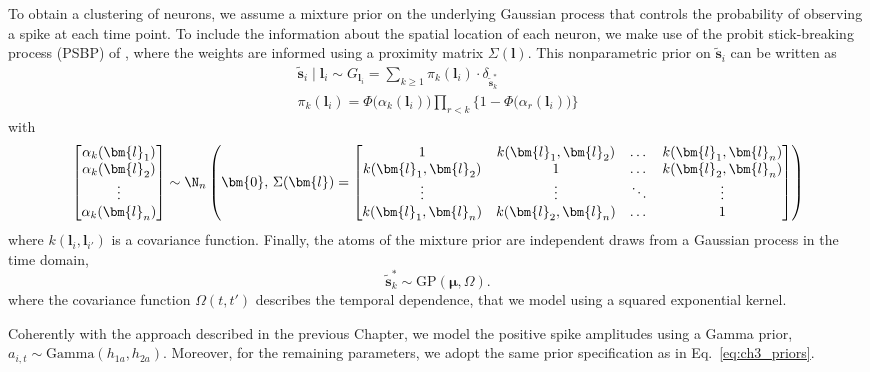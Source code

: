 To obtain a clustering of neurons, we assume a mixture prior on the underlying Gaussian process that controls the probability of observing a spike at each time point. 
To include the information about the spatial location of each neuron, we make use of the probit stick-breaking process (PSBP) of \cite{rodriguez2011}, where the weights are informed using a proximity matrix $\Sigma(\bm{l})$.
This nonparametric prior on $\tilde{\bm{s}}_i$ can be written as
\begin{equation}
\begin{gathered}
\tilde{\bm{s}}_i\mid \bm{l}_i  \sim G_{\bm{l}_i} = \sum_{k\geq1} \pi_k(\bm{l}_i)\cdot \delta_{\tilde{\bm{s}}^*_k }\\
\pi_k(\bm{l}_i) = \Phi\big(\alpha_k(\bm{l}_i)\big) \prod_{r<k} \big\{ 1- \Phi\big(\alpha_r(\bm{l}_i)\big)\big\}
\end{gathered}
\end{equation}
with 
\begin{equation*}
\begin{bmatrix}
\alpha_k(\bm{l}_1) \\
\alpha_k(\bm{l}_2) \\
\vdots \\
\alpha_k(\bm{l}_n) 
\end{bmatrix} \sim \N_n \left(
\bm{0},\, \Sigma(\bm{l}) = 
\begin{bmatrix}
1 & k(\bm{l}_1,\bm{l}_2) & \dots & k(\bm{l}_1,\bm{l}_n)\\
k(\bm{l}_1,\bm{l}_2) & 1 & \dots & k(\bm{l}_2,\bm{l}_n) \\
\vdots & \vdots & \ddots & \vdots \\
k(\bm{l}_1,\bm{l}_n) & k(\bm{l}_2,\bm{l}_n) & \dots & 1
\end{bmatrix}
\right)
\end{equation*}
where $k(\bm{l}_i,\bm{l}_{i'})$ is a covariance function. Finally, the atoms of the mixture prior are independent draws from a Gaussian process in the time domain, 
\begin{equation*}
\tilde{\bm{s}}^*_k \sim \mathrm{GP}(\bm{\mu},\Omega).
\end{equation*}
where the covariance function $\Omega(t,t')$ describes the temporal dependence, that we model using a squared exponential kernel.

Coherently with the approach described in the previous Chapter, we model the positive spike amplitudes using a Gamma prior, $a_{i,t}\sim\mathrm{Gamma}(h_{1a},h_{2a})$. Moreover, for the remaining parameters, we adopt the same prior specification as in Eq.~\eqref{eq:ch3_priors}.


